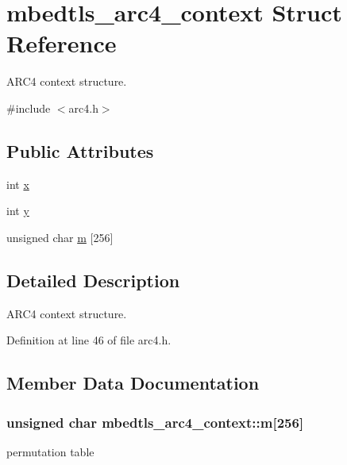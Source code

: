 \hypertarget{structmbedtls__arc4__context}{\section{mbedtls\-\_\-arc4\-\_\-context Struct Reference}
\label{structmbedtls__arc4__context}
}


A\-R\-C4 context structure.  




{\ttfamily \#include $<$arc4.\-h$>$}

\subsection*{Public Attributes}
\begin{DoxyCompactItemize}
\item 
int \hyperlink{structmbedtls__arc4__context_a35ada04bd0e0ebb3c91fe0a7be91d62c}{x}
\item 
int \hyperlink{structmbedtls__arc4__context_a53d6a6d70c2b3ef5cd4467ae32e21429}{y}
\item 
unsigned char \hyperlink{structmbedtls__arc4__context_a18aed220cbc1645d368721b380354688}{m} \mbox{[}256\mbox{]}
\end{DoxyCompactItemize}


\subsection{Detailed Description}
A\-R\-C4 context structure. 

Definition at line 46 of file arc4.\-h.



\subsection{Member Data Documentation}
\hypertarget{structmbedtls__arc4__context_a18aed220cbc1645d368721b380354688}{
\subsubsection[{m}]{\setlength{\rightskip}{0pt plus 5cm}unsigned char mbedtls\-\_\-arc4\-\_\-context\-::m\mbox{[}256\mbox{]}}}\label{structmbedtls__arc4__context_a18aed220cbc1645d368721b380354688}
permutation table 

